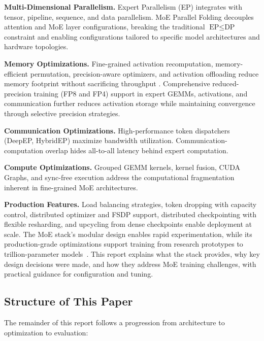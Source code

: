 \textbf{Multi-Dimensional Parallelism.} Expert Parallelism (EP) integrates with tensor, pipeline, sequence, and data parallelism. MoE Parallel Folding \cite{liu2025moeparallelfoldingheterogeneous} decouples attention and MoE layer configurations, breaking the traditional $\text{EP} \leq \text{DP}$ constraint and enabling configurations tailored to specific model architectures and hardware topologies.

\textbf{Memory Optimizations.} Fine-grained activation recomputation, memory-efficient permutation, precision-aware optimizers, and activation offloading reduce memory footprint without sacrificing throughput \cite{korthikanti2022reducingactivationrecomputationlarge,a2023learningwithdistributedoptimization}. Comprehensive reduced-precision training (FP8 and FP4) support in expert GEMMs, activations, and communication further reduces activation storage while maintaining convergence through selective precision strategies.

\textbf{Communication Optimizations.} High-performance token dispatchers (DeepEP, HybridEP) maximize bandwidth utilization. Communication-computation overlap hides all-to-all latency behind expert computation.

\textbf{Compute Optimizations.} Grouped GEMM kernels, kernel fusion, CUDA Graphs, and sync-free execution address the computational fragmentation inherent in fine-grained MoE architectures.

\textbf{Production Features.} Load balancing strategies, token dropping with capacity control, distributed optimizer and FSDP support, distributed checkpointing with flexible resharding, and upcycling from dense checkpoints enable deployment at scale.
The MoE stack's modular design enables rapid experimentation, while its production-grade optimizations support training from research prototypes to trillion-parameter models~\cite{nvidiamcoremoeuserguide}. This report explains what the stack provides, why key design decisions were made, and how they address MoE training challenges, with practical guidance for configuration and tuning.

\subsection{Structure of This Paper}

The remainder of this report follows a progression from architecture to optimization to evaluation:

